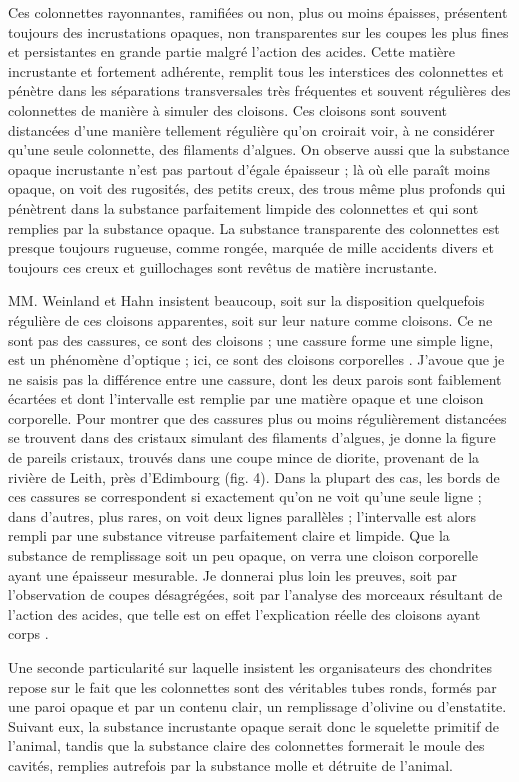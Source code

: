 \documentclass[a4paper, 12pt, oneside, french]{book}
\begin{document}
Ces colonnettes rayonnantes, ramifiées ou non, plus ou moins épaisses, présentent toujours des incrustations opaques, non transparentes sur les coupes les plus fines et persistantes en grande partie malgré l'action des acides. Cette matière incrustante et fortement adhérente, remplit tous les interstices des colonnettes et pénètre dans les séparations transversales très fréquentes et souvent régulières des colonnettes de manière à simuler des cloisons. Ces cloisons sont souvent distancées d'une manière tellement régulière qu'on croirait voir, à ne considérer qu'une seule colonnette, des filaments d'algues. On observe aussi que la substance opaque incrustante n'est pas partout d'égale épaisseur ; là où elle paraît moins opaque, on voit des rugosités, des petits creux, des trous même plus profonds qui pénètrent dans la substance parfaitement limpide des colonnettes et qui sont remplies par la substance opaque. La substance transparente des colonnettes est presque toujours rugueuse, comme rongée, marquée de mille accidents divers et toujours ces creux et guillochages sont revêtus de matière incrustante.

MM. Weinland et Hahn insistent beaucoup, soit sur la disposition quelquefois régulière de ces cloisons apparentes, soit sur leur nature comme cloisons. Ce ne sont pas des cassures, ce sont des cloisons ; une cassure forme une simple ligne, est \og un phénomène d'optique \fg ; ici, ce sont \og des cloisons corporelles \fg. J'avoue que je ne saisis pas la différence entre une cassure, dont les deux parois sont faiblement écartées et dont l'intervalle est remplie par une matière opaque et une cloison corporelle. Pour montrer que des cassures plus ou moins régulièrement distancées se trouvent dans des cristaux simulant des filaments d'algues, je donne la figure de pareils cristaux, trouvés dans une coupe mince de diorite, provenant de la rivière de Leith, près d'Edimbourg (fig. 4). Dans la plupart des cas, les bords de ces cassures se correspondent si exactement qu'on ne voit qu'une seule ligne ; dans d'autres, plus rares, on voit deux lignes parallèles ; l'intervalle est alors rempli par une substance vitreuse parfaitement claire et limpide. Que la substance de remplissage soit un peu opaque, on verra une cloison corporelle ayant une épaisseur mesurable. Je donnerai plus loin les preuves, soit par l'observation de coupes désagrégées, soit par l'analyse des morceaux résultant de l'action des acides, que telle est on effet l'explication réelle des cloisons \og ayant corps \fg.

Une seconde particularité sur laquelle insistent les organisateurs des chondrites repose sur le fait que les colonnettes sont des véritables tubes ronds, formés par une paroi opaque et par un contenu clair, un remplissage d'olivine ou d'enstatite. Suivant eux, la substance incrustante opaque serait donc le squelette primitif de l'animal, tandis que la substance claire des colonnettes formerait le moule des cavités, remplies autrefois par la substance molle et détruite de l'animal.
\end{document}
